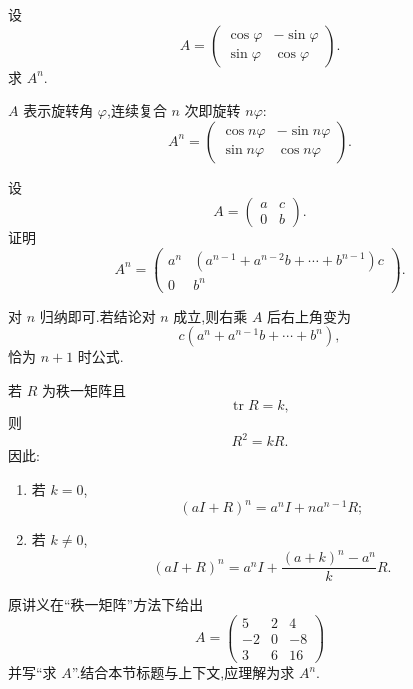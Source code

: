 \begin{example}
设
\[
A=
\begin{pmatrix}
\cos\varphi&-\sin\varphi\\
\sin\varphi&\cos\varphi
\end{pmatrix}.
\]
求 $A^n$.
\end{example}
\exampleblank

\begin{solution}
$A$ 表示旋转角 $\varphi$,连续复合 $n$ 次即旋转 $n\varphi$:
\[
\boxed{
A^n=
\begin{pmatrix}
\cos n\varphi&-\sin n\varphi\\
\sin n\varphi&\cos n\varphi
\end{pmatrix}.
}
\]
\end{solution}


\begin{example}
设
\[
A=
\begin{pmatrix}
a&c\\
0&b
\end{pmatrix}.
\]
证明
\[
A^n=
\begin{pmatrix}
a^n&
\left(a^{n-1}+a^{n-2}b+\cdots+b^{n-1}\right)c\\
0&b^n
\end{pmatrix}.
\]
\end{example}
\exampleblank

\begin{solution}
对 $n$ 归纳即可.若结论对 $n$ 成立,则右乘 $A$ 后右上角变为
\[
c\left(
a^n+a^{n-1}b+\cdots+b^n
\right),
\]
恰为 $n+1$ 时公式.
\end{solution}


\begin{proposition}[\markstar]
若 $R$ 为秩一矩阵且
\[
\operatorname{tr}R=k,
\]
则
\[
R^2=kR.
\]
因此:
\begin{enumerate}
    \item 若 $k=0$,
    \[
    (aI+R)^n=a^nI+na^{n-1}R;
    \]
    \item 若 $k\neq0$,
    \[
    (aI+R)^n
    =
    a^nI
    +
    \dfrac{(a+k)^n-a^n}{k}R.
    \]
\end{enumerate}
\end{proposition}


\begin{example}
原讲义在``秩一矩阵''方法下给出
\[
A=
\begin{pmatrix}
5&2&4\\
-2&0&-8\\
3&6&16
\end{pmatrix}
\]
并写``求 $A$''.结合本节标题与上下文,应理解为求 $A^n$.
\end{example}
\exampleblank

